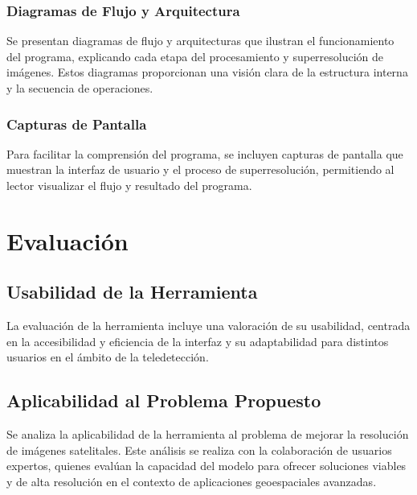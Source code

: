 \subsection{Diagramas de Flujo y Arquitectura}
Se presentan diagramas de flujo y arquitecturas que ilustran el funcionamiento del programa, explicando cada etapa del procesamiento y superresolución de imágenes. Estos diagramas proporcionan una visión clara de la estructura interna y la secuencia de operaciones.

\subsection{Capturas de Pantalla}
Para facilitar la comprensión del programa, se incluyen capturas de pantalla que muestran la interfaz de usuario y el proceso de superresolución, permitiendo al lector visualizar el flujo y resultado del programa.

\chapter{Evaluación}

\section{Usabilidad de la Herramienta}
La evaluación de la herramienta incluye una valoración de su usabilidad, centrada en la accesibilidad y eficiencia de la interfaz y su adaptabilidad para distintos usuarios en el ámbito de la teledetección.

\section{Aplicabilidad al Problema Propuesto}
Se analiza la aplicabilidad de la herramienta al problema de mejorar la resolución de imágenes satelitales. Este análisis se realiza con la colaboración de usuarios expertos, quienes evalúan la capacidad del modelo para ofrecer soluciones viables y de alta resolución en el contexto de aplicaciones geoespaciales avanzadas.
